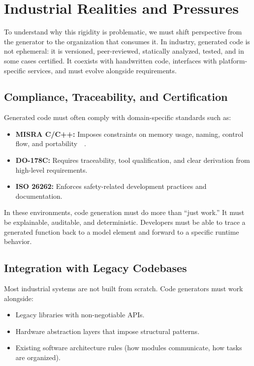 \section{Industrial Realities and Pressures}
\label{sec:industrial_realities}

To understand why this rigidity is problematic, we must shift perspective from the generator to the organization that consumes it. In industry, generated code is not ephemeral: it is versioned, peer-reviewed, statically analyzed, tested, and in some cases certified. It coexists with handwritten code, interfaces with platform-specific services, and must evolve alongside requirements.

\subsection*{Compliance, Traceability, and Certification}

Generated code must often comply with domain-specific standards such as:

\begin{itemize}
	\item \textbf{MISRA C/C++:} Imposes constraints on memory usage, naming, control flow, and portability~\cite{Misra_C_2025}~\cite{Misra_Cpp_2023}.
	\item \textbf{DO-178C:} Requires traceability, tool qualification, and clear derivation from high-level requirements. 
	\item \textbf{ISO 26262:} Enforces safety-related development practices and documentation.
\end{itemize}

In these environments, code generation must do more than “just work.” It must be explainable, auditable, and deterministic. Developers must be able to trace a generated function back to a model element and forward to a specific runtime behavior.

\subsection*{Integration with Legacy Codebases}

Most industrial systems are not built from scratch. Code generators must work alongside:

\begin{itemize}
	\item Legacy libraries with non-negotiable APIs.
	\item Hardware abstraction layers that impose structural patterns.
	\item Existing software architecture rules (how modules communicate, how tasks are organized).
\end{itemize}

